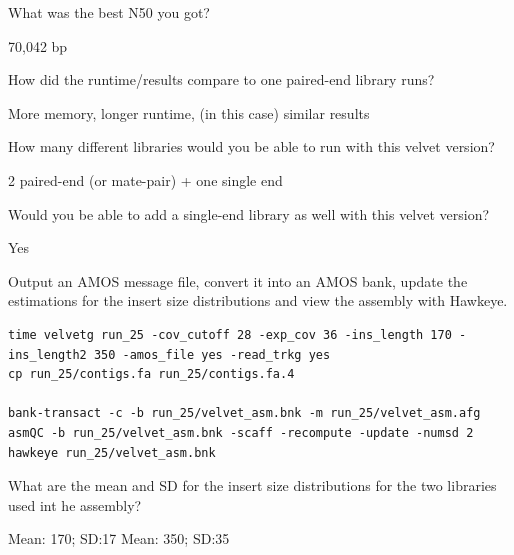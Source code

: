\begin{questions}
What was the best N50 you got?
\begin{answer}
70,042 bp
\end{answer}

How did the runtime/results compare to one paired-end library runs?
\begin{answer}
More memory, longer runtime, (in this case) similar results
\end{answer}

How many different libraries would you be able to run with this velvet version?
\begin{answer}
2 paired-end (or mate-pair) + one single end
\end{answer}

Would you be able to add a single-end library as well with this velvet version?
\begin{answer}
Yes
\end{answer}
\end{questions}


\begin{bonus}

Output an AMOS message file, convert it into an AMOS bank, update the
estimations for the insert size distributions and view the assembly with
Hawkeye.

\begin{lstlisting}
time velvetg run_25 -cov_cutoff 28 -exp_cov 36 -ins_length 170 -ins_length2 350 -amos_file yes -read_trkg yes
cp run_25/contigs.fa run_25/contigs.fa.4

bank-transact -c -b run_25/velvet_asm.bnk -m run_25/velvet_asm.afg
asmQC -b run_25/velvet_asm.bnk -scaff -recompute -update -numsd 2
hawkeye run_25/velvet_asm.bnk
\end{lstlisting}

\begin{questions}
What are the mean and SD for the insert size distributions for the two libraries
used int he assembly?
\begin{answer}
Mean: 170; SD:17
Mean: 350; SD:35
\end{answer}
\end{questions}

\end{bonus}

